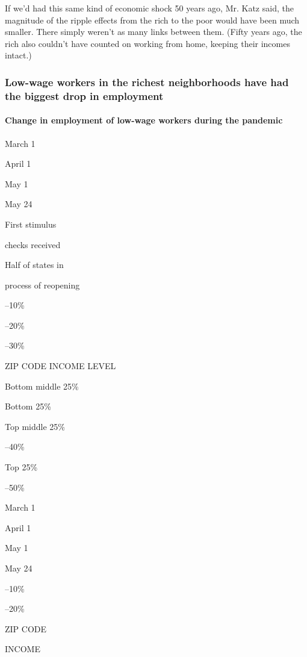 If we'd had this same kind of economic shock 50 years ago, Mr. Katz
said, the magnitude of the ripple effects from the rich to the poor
would have been much smaller. There simply weren't as many links between
them. (Fifty years ago, the rich also couldn't have counted on working
from home, keeping their incomes intact.)

\hypertarget{low-wage-workers-in-the-richest-neighborhoods-have-had-the-biggest-drop-in-employment}{%
\subsubsection{Low-wage workers in the richest neighborhoods have had
the biggest drop in
employment}\label{low-wage-workers-in-the-richest-neighborhoods-have-had-the-biggest-drop-in-employment}}

\hypertarget{change-in-employment-of-low-wage-workers-during-the-pandemic}{%
\paragraph{Change in employment of low-wage workers during the
pandemic}\label{change-in-employment-of-low-wage-workers-during-the-pandemic}}

March 1

April 1

May 1

May 24

First stimulus

checks received

Half of states in

process of reopening

--10\%

--20\%

--30\%

ZIP CODE INCOME LEVEL

Bottom middle 25\%

Bottom 25\%

Top middle 25\%

--40\%

Top 25\%

--50\%

March 1

April 1

May 1

May 24

--10\%

--20\%

ZIP CODE

INCOME

